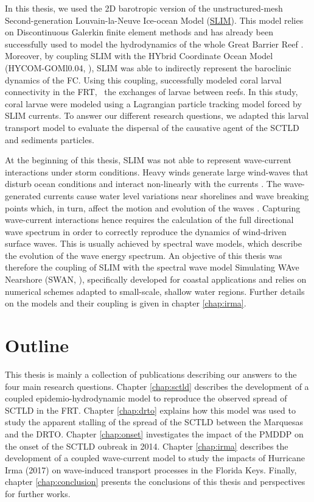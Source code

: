 In this thesis, we used the 2D barotropic version of the unstructured-mesh Second-generation Louvain-la-Neuve Ice-ocean Model (\href{https://www.slim-ocean.be/}{SLIM}). This model relies on Discontinuous Galerkin finite element methods \citep{aizinger2002discontinuous} and has already been successfully used to model the hydrodynamics of the whole Great Barrier Reef \citep{lambrechts2008multi}. Moreover, by coupling SLIM with the HYbrid Coordinate Ocean Model (HYCOM-GOMl0.04, \citealp{chassignet2007hycom}), SLIM was able to indirectly represent the baroclinic dynamics of the FC. Using this coupling, \cite{frys2020fine} successfully modeled coral larval connectivity in the FRT, \ie~the exchanges of larvae between reefs. In this study, coral larvae were modeled using a Lagrangian particle tracking model forced by SLIM currents. To answer our different research questions, we adapted this larval transport model to evaluate the dispersal of the causative agent of the SCTLD and sediments particles.

At the beginning of this thesis, SLIM was not able to represent wave-current interactions under storm conditions. Heavy winds generate large wind-waves that disturb ocean conditions and interact non-linearly with the currents \citep{liu2020impacts,wu2011fvcom}. The wave-generated currents cause water level variations near shorelines and wave breaking points which, in turn, affect the motion and evolution of the waves \citep{longuet1970longshore, sikiric2013coupling}. Capturing wave-current interactions hence requires the calculation of the full directional wave spectrum in order to correctly reproduce the dynamics of wind-driven surface waves. This is usually achieved by spectral wave models, which describe the evolution of the wave energy spectrum. An objective of this thesis was therefore the coupling of SLIM with the spectral wave model Simulating WAve Nearshore (SWAN, \citealp{booij1999third}), specifically developed for coastal applications and relies on numerical schemes adapted to small-scale, shallow water regions. Further details on the models and their coupling is given in chapter \ref{chap:irma}.

\section*{Outline}
This thesis is mainly a collection of publications describing our answers to the four main research questions. Chapter \ref{chap:sctld} describes the development of a coupled epidemio-hydrodynamic model to reproduce the observed spread of SCTLD in the FRT. Chapter \ref{chap:drto} explains how this model was used to study the apparent stalling of the spread of the SCTLD between the Marquesas and the DRTO. Chapter \ref{chap:onset} investigates the impact of the PMDDP on the onset of the SCTLD oubreak in 2014. Chapter \ref{chap:irma} describes the development of a coupled wave-current model to study the impacts of Hurricane Irma (2017) on wave-induced transport processes in the Florida Keys. Finally, chapter \ref{chap:conclusion} presents the conclusions of this thesis and perspectives for further works. 

